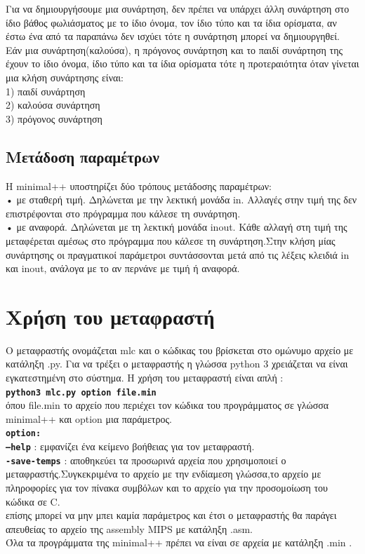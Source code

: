\documentclass[12pt,a4paper,a4paper]{report}
\begin{document}
Για να δημιουργήσουμε μια συνάρτηση, δεν πρέπει να υπάρχει άλλη συνάρτηση στο ίδιο βάθος φωλιάσματος με το ίδιο όνομα, τον ίδιο τύπο και τα ίδια ορίσματα, αν έστω ένα από τα παραπάνω δεν ισχύει τότε η συνάρτηση μπορεί να δημιουργηθεί.\\
Εάν μια συνάρτηση(καλούσα), η πρόγονος συνάρτηση και το παιδί συνάρτηση της έχουν το ίδιο όνομα, ίδιο τύπο και τα ίδια ορίσματα τότε η προτεραιότητα όταν γίνεται μια κλήση συνάρτησης είναι:\\
1) παιδί συνάρτηση\\
2) καλούσα συνάρτηση\\
3) πρόγονος συνάρτηση\\


\section{Μετάδοση παραμέτρων}
 Η minimal++ υποστηρίζει δύο τρόπους μετάδοσης παραμέτρων:\\
  • με σταθερή τιμή. Δηλώνεται με την λεκτική μονάδα in. Αλλαγές στην τιμή της δεν επιστρέφονται στο πρόγραμμα που κάλεσε τη συνάρτηση.\\
  • με αναφορά. Δηλώνεται με τη λεκτική μονάδα inout. Κάθε αλλαγή στη τιμή της μεταφέρεται αμέσως στο πρόγραμμα που κάλεσε τη συνάρτηση.Στην κλήση μίας συνάρτησης οι πραγματικοί παράμετροι συντάσσονται μετά από τις λέξεις κλειδιά in και inout, ανάλογα με το αν περνάνε με τιμή ή αναφορά.\\



\chapter{Χρήση του μεταφραστή}
Ο μεταφραστής ονομάζεται mlc και ο κώδικας του βρίσκεται στο ομώνυμο αρχείο με κατάληξη .py. Για να τρέξει ο μεταφραστής η γλώσσα python 3 χρειάζεται να είναι εγκατεστημένη στο σύστημα. Η χρήση του μεταφραστή είναι απλή :\\
\texttt{\textbf{python3 mlc.py option file.min}}\\
όπου file.min το αρχείο που περιέχει τον κώδικα του προγράμματος σε γλώσσα minimal++ και option μια παράμετρος.\\
\texttt{\textbf{option:}}\\
\texttt{\textbf{--help}} : εμφανίζει ένα κείμενο βοήθειας για τον μεταφραστή.\\
\texttt{\textbf{-save-temps}} : αποθηκεύει τα προσωρινά αρχεία που χρησιμοποιεί ο μεταφραστής.Συγκεκριμένα το αρχείο με την ενδίαμεση γλώσσα,το αρχείο με πληροφορίες για τον πίνακα συμβόλων και το αρχείο για την προσομοίωση του κώδικα σε C.\\
επίσης μπορεί να μην μπει καμία παράμετρος και έτσι ο μεταφραστής θα παράγει απευθείας το αρχείο της assembly MIPS με κατάληξη .asm.\\
Όλα τα προγράμματα της minimal++ πρέπει να είναι σε αρχεία με κατάληξη .min .\\
   
\end{document}
